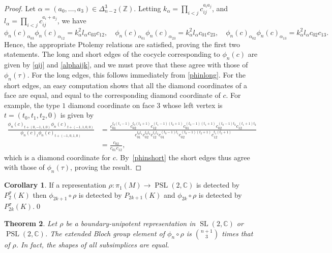 \documentclass[11pt]{amsart}
\newtheorem{theorem}{Theorem}[section]
\theoremstyle{definition}
\newtheorem{corollary}[theorem]{Corollary}
\numberwithin{equation}{section}
\DeclareMathOperator{\SL}{SL}
\DeclareMathOperator{\PSL}{PSL}
\newcommand{\C}{\mathbb C}
\newcommand{\Z}{\mathbb Z}
\begin{document}
\begin{proof}
Let $\alpha=(a_0,\dots,a_3)\in \Delta^3_{n-2}(\Z)$. Letting 
$k_\alpha=\prod_{i<j}c_{ij}^{a_ia_j}$, and $l_\alpha=\prod_{i<j}c_{ij}^{a_i+a_j}$, we have
\begin{equation}
\phi_n(c)_{\alpha_{03}}\phi_n(c)_{\alpha_{12}}=k_\alpha^2l_\alpha c_{03}c_{12},\quad 
\phi_n(c)_{\alpha_{01}}\phi_n(c)_{\alpha_{23}}=k_\alpha^2l_\alpha c_{01}c_{23},\quad 
\phi_n(c)_{\alpha_{02}}\phi_n(c)_{\alpha_{13}}=k_\alpha^2l_\alpha c_{02}c_{13}.
\end{equation}
Hence, the appropriate Ptolemy relations are satisfied, proving the first 
two statements. The long and short edges of the cocycle corresponding to 
$\phi_n(c)$ are given by \eqref{qij} and \eqref{alphaijk}, and we must 
prove that these agree with those of $\phi_n(\tau)$. For the long edges, 
this follows immediately from \eqref{phinlong}. For the short edges, an 
easy computation shows that all the diamond coordinates of a face are equal, 
and equal to the corresponding diamond coordinate of $c$. For example, the 
type $1$ diamond coordinate on face $3$ whose left vertex is 
$t=(t_0,t_1,t_2,0)$ is given by
\begin{equation}
\begin{aligned}
\frac{\phi_n(c)_{t+(0,-1,1,0)}\phi_n(c)_{t+(-1,1,0,0)}}{\phi_n(c)_{t}\phi_n(c)_{t+(-1,0,1,0)}}&=\frac{c_{01}^{t_0(t_1-1)}c_{02}^{t_0(t_2+1)}c_{12}^{(t_1-1)(t_2+1)}c_{01}^{(t_0-1)(t_1+1)}c_{02}^{(t_0-1)t_2}c_{12}^{(t_1+1)t_2}}{c_{01}^{t_0t_1}c_{02}^{t_0t_2}c_{12}^{t_1t_2}c_{01}^{(t_0-1)t_1}c_{02}^{(t_0-1)(t_2+1)}c_{12}^{t_1(t_2+1)}}\\&=\frac{c_{02}}{c_{01}c_{12}},
\end{aligned}
\end{equation}
which is a diamond coordinate for $c$. By~\eqref{phinshort} the short edges 
thus agree with those of $\phi_n(\tau)$, proving the result.  
\end{proof}

\begin{corollary}\label{adjointPtolemycor} If a representation $\rho\colon\pi_1(M)\to\PSL(2,\C)$ is detected by $P_2^\sigma(K)$ then $\phi_{2k+1}\circ\rho$ is detected by $P_{2k+1}(K)$ and $\phi_{2k}\circ\rho$ is detected by $P_{2k}^\sigma(K)$.\qed
\end{corollary}

\begin{theorem}
Let $\rho$ be a boundary-unipotent representation in $\SL(2,\C)$ or 
$\PSL(2,\C)$. The extended Bloch group element of $\phi_n\circ \rho$ 
is $\binom{n+1}{3}$ times that of $\rho$. In fact, the shapes of all subsimplices are equal.
\end{theorem}
\end{document}
